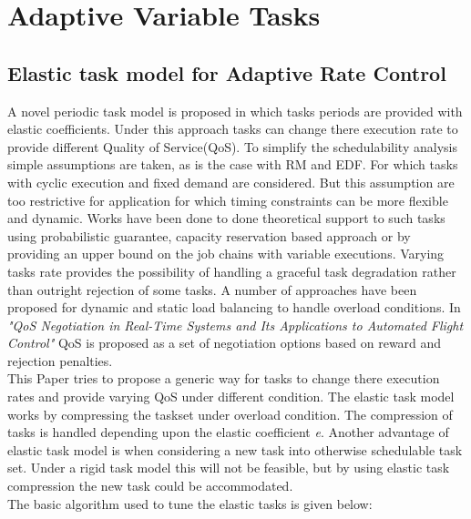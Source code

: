 \section{Adaptive Variable Tasks}
\subsection{Elastic task model for Adaptive Rate Control}
A novel periodic task model is proposed in which tasks periods are provided with elastic coefficients. Under this approach tasks can change there execution rate to provide different Quality of Service(QoS).
To simplify the schedulability analysis simple assumptions are taken, as is the case with RM and EDF. For which tasks with cyclic execution and fixed demand are considered.
But this assumption are too restrictive for application for which timing constraints can be more flexible and dynamic.
Works have been done to done theoretical support to such tasks using probabilistic guarantee, capacity reservation based approach or by providing an upper bound on the job chains with variable executions.
Varying tasks rate provides the possibility of handling a graceful task degradation rather than outright rejection of some tasks.
A number of approaches have been proposed for dynamic and static load balancing to handle overload conditions. In \textit{"QoS Negotiation  in  Real-Time Systems  and  Its  Applications to Automated Flight Control"} QoS is proposed as a set of negotiation options based on reward and rejection penalties.\\
This Paper tries to propose a generic way for tasks to change there execution rates and provide varying QoS under different condition.
The elastic task model works by compressing the taskset under overload condition. The compression of tasks is handled depending upon the elastic coefficient \textit{e}. Another advantage of elastic task model is when considering a new task into otherwise schedulable task set. Under a rigid task model this will not be feasible, but by using elastic task compression the new task could be accommodated.\\
The basic algorithm used to tune the elastic tasks is given below:


